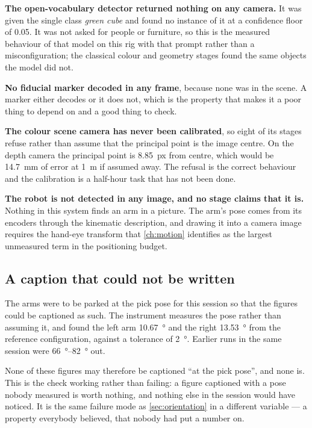 \textbf{The open-vocabulary detector returned nothing on any camera.} It was
given the single class \emph{green cube} and found no instance of it at a
confidence floor of \num{0.05}. It was not asked for people or furniture, so
this is the measured behaviour of that model on this rig with that prompt
rather than a misconfiguration; the classical colour and geometry stages found
the same objects the model did not.

\textbf{No fiducial marker decoded in any frame}, because none was in the
scene. A marker either decodes or it does not, which is the property that
makes it a poor thing to depend on and a good thing to check.

\textbf{The colour scene camera has never been calibrated}, so eight of its
stages refuse rather than assume that the principal point is the image centre.
On the depth camera the principal point is \SI{8.85}{px} from centre, which
would be \SI{14.7}{\milli\metre} of error at \SI{1}{\metre} if assumed away.
The refusal is the correct behaviour and the calibration is a half-hour task
that has not been done.

\textbf{The robot is not detected in any image, and no stage claims that it
is.} Nothing in this system finds an arm in a picture. The arm's pose comes
from its encoders through the kinematic description, and drawing it into a
camera image requires the hand-eye transform that \cref{ch:motion} identifies
as the largest unmeasured term in the positioning budget.

\subsection{A caption that could not be written}

The arms were to be parked at the pick pose for this session so that the
figures could be captioned as such. The instrument measures the pose rather
than assuming it, and found the left arm \SI{10.67}{\degree} and the right
\SI{13.53}{\degree} from the reference configuration, against a tolerance of
\SI{2}{\degree}. Earlier runs in the same session were \SIrange{66}{82}{\degree}
out.

None of these figures may therefore be captioned ``at the pick pose'', and
none is. This is the check working rather than failing: a figure captioned
with a pose nobody measured is worth nothing, and nothing else in the session
would have noticed. It is the same failure mode as \cref{sec:orientation} in a
different variable --- a property everybody believed, that nobody had put a
number on.

